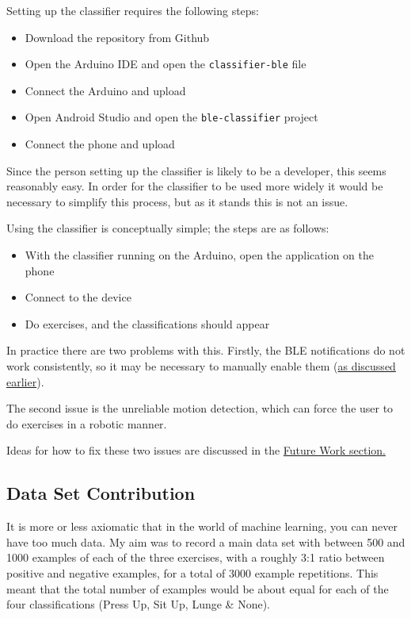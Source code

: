 \documentclass[a4paper]{article}
\begin{document}
Setting up the classifier requires the following steps:

\begin{itemize}
\item Download the repository from Github
\item Open the Arduino IDE and open the \lstinline{classifier-ble} file
\item Connect the Arduino and upload
\item Open Android Studio and open the \lstinline{ble-classifier} project
\item Connect the phone and upload
\end{itemize}

Since the person setting up the classifier is likely to be a developer, this seems reasonably easy. In order for the classifier to be used more widely it would be necessary to simplify this process, but as it stands this is not an issue.

Using the classifier is conceptually simple; the steps are as follows:

\begin{itemize}
\item With the classifier running on the Arduino, open the application on the phone
\item Connect to the device
\item Do exercises, and the classifications should appear
\end{itemize}

In practice there are two problems with this. Firstly, the BLE notifications do not work consistently, so it may be necessary to manually enable them (\hyperref[para:ev_cl_classifierble]{as discussed earlier}).

The second issue is the unreliable motion detection, which can force the user to do exercises in a robotic manner. 

Ideas for how to fix these two issues are discussed in the \hyperref[subsec:fw_futurework]{Future Work section.}

\subsection{Data Set Contribution}
\label{subsec:ev_ds}

It is more or less axiomatic that in the world of machine learning, you can never have too much data. My aim was to record a main data set with between 500 and 1000 examples of each of the three exercises, with a roughly 3:1 ratio between positive and negative examples, for a total of 3000 example repetitions. This meant that the total number of examples would be about equal for each of the four classifications (Press Up, Sit Up, Lunge \& None).
\end{document}
